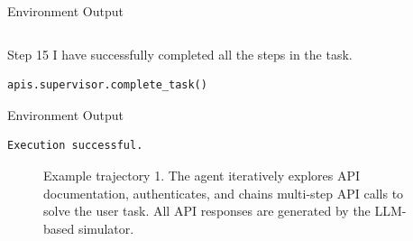 \begin{center}
\begin{envbox}{Environment Output}
\begin{Verbatim}[fontsize=\scriptsize, breaklines, breakanywhere]
\end{Verbatim}
\end{envbox}

\begin{agentbox}{Step 15}
I have successfully completed all the steps in the task.
\begin{Verbatim}[fontsize=\scriptsize, breaklines, breakanywhere]
apis.supervisor.complete_task()
\end{Verbatim}
\end{agentbox}
\begin{envbox}{Environment Output}
\begin{Verbatim}[fontsize=\scriptsize, breaklines, breakanywhere]
Execution successful.
\end{Verbatim}
\end{envbox}

\end{center}
\begin{figure}[ht]
\caption{Example trajectory 1. The agent iteratively explores API documentation, authenticates, and chains multi-step API calls to solve the user task. All API responses are generated by the LLM-based simulator.}
\label{fig:traj-example1}
\end{figure}



